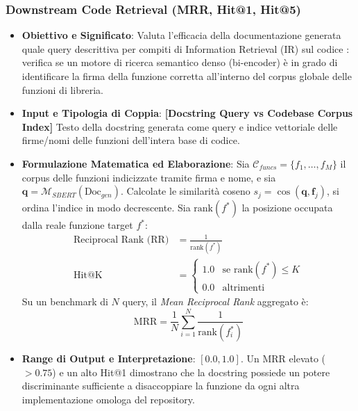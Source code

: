 \subsubsection{Downstream Code Retrieval (MRR, Hit@1, Hit@5)}
\label{subsubsec:code_retrieval}
\begin{itemize}[leftmargin=*, label=\textbullet]
    \item \textbf{Obiettivo e Significato}: Valuta l'efficacia della documentazione generata quale query descrittiva per compiti di Information Retrieval (IR) sul codice \cite{zhu_deep_2024}: verifica se un motore di ricerca semantico denso (bi-encoder) è in grado di identificare la firma della funzione corretta all'interno del corpus globale delle funzioni di libreria.
    \item \textbf{Input e Tipologia di Coppia}: \textbf{[Docstring Query vs Codebase Corpus Index]} Testo della docstring generata come query e indice vettoriale delle firme/nomi delle funzioni dell'intera base di codice.
    \item \textbf{Formulazione Matematica ed Elaborazione}: Sia $\mathcal{C}_{funcs} = \{f_1, \dots, f_M\}$ il corpus delle funzioni indicizzate tramite firma e nome, e sia $\mathbf{q} = \mathcal{M}_{SBERT}(\text{Doc}_{gen})$. Calcolate le similarità coseno $s_j = \cos(\mathbf{q}, \mathbf{f}_j)$, si ordina l'indice in modo decrescente. Sia $\text{rank}(f^*)$ la posizione occupata dalla reale funzione target $f^*$:
    \begin{align}
        \text{Reciprocal Rank (RR)} &= \frac{1}{\text{rank}(f^*)} \label{eq:rr_formula} \\
        \text{Hit@K} &= \begin{cases}
            1.0 & \text{se } \text{rank}(f^*) \le K \\
            0.0 & \text{altrimenti}
        \end{cases} \label{eq:hit_at_k}
    \end{align}
    Su un benchmark di $N$ query, il \emph{Mean Reciprocal Rank} aggregato è:
    \begin{equation}
        \text{MRR} = \frac{1}{N} \sum_{i=1}^N \frac{1}{\text{rank}(f_i^*)}
        \label{eq:mrr_formula}
    \end{equation}
    \item \textbf{Range di Output e Interpretazione}: $[0.0, 1.0]$. Un MRR elevato ($> 0.75$) e un alto Hit@1 dimostrano che la docstring possiede un potere discriminante sufficiente a disaccoppiare la funzione da ogni altra implementazione omologa del repository.
\end{itemize}

